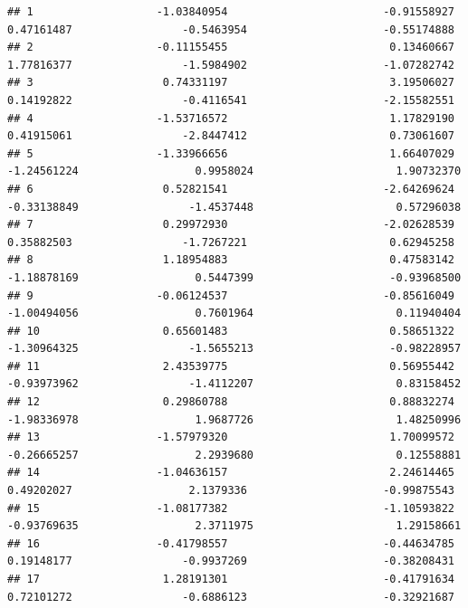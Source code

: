 \documentclass[
]{article}
\begin{document}
\begin{verbatim}
## 1                   -1.03840954                        -0.91558927                    0.47161487                 -0.5463954                     -0.55174888
## 2                   -0.11155455                         0.13460667                    1.77816377                 -1.5984902                     -1.07282742
## 3                    0.74331197                         3.19506027                    0.14192822                 -0.4116541                     -2.15582551
## 4                   -1.53716572                         1.17829190                    0.41915061                 -2.8447412                      0.73061607
## 5                   -1.33966656                         1.66407029                   -1.24561224                  0.9958024                      1.90732370
## 6                    0.52821541                        -2.64269624                   -0.33138849                 -1.4537448                      0.57296038
## 7                    0.29972930                        -2.02628539                    0.35882503                 -1.7267221                      0.62945258
## 8                    1.18954883                         0.47583142                   -1.18878169                  0.5447399                     -0.93968500
## 9                   -0.06124537                        -0.85616049                   -1.00494056                  0.7601964                      0.11940404
## 10                   0.65601483                         0.58651322                   -1.30964325                 -1.5655213                     -0.98228957
## 11                   2.43539775                         0.56955442                   -0.93973962                 -1.4112207                      0.83158452
## 12                   0.29860788                         0.88832274                   -1.98336978                  1.9687726                      1.48250996
## 13                  -1.57979320                         1.70099572                   -0.26665257                  2.2939680                      0.12558881
## 14                  -1.04636157                         2.24614465                    0.49202027                  2.1379336                     -0.99875543
## 15                  -1.08177382                        -1.10593822                   -0.93769635                  2.3711975                      1.29158661
## 16                  -0.41798557                        -0.44634785                    0.19148177                 -0.9937269                     -0.38208431
## 17                   1.28191301                        -0.41791634                    0.72101272                 -0.6886123                     -0.32921687

\end{verbatim}
\end{document}
